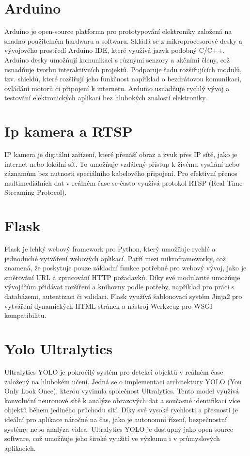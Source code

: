\section{Arduino}\label{sec:arduino}
Arduino je open-source platforma pro prototypování elektroniky založená na snadno použitelném hardwaru a softwaru.
Skládá se z mikroprocesorové desky a vývojového prostředí Arduino IDE, které využívá jazyk podobný C/C++.
Arduino desky umožňují komunikaci s různými senzory a akčními členy, což usnadňuje tvorbu interaktivních projektů.
Podporuje řadu rozšiřujících modulů, tzv. shieldů, které rozšiřují jeho funkčnost například o bezdrátovou komunikaci, ovládání motorů či připojení k internetu.
Arduino usnadňuje rychlý vývoj a testování elektronických aplikací bez hlubokých znalostí elektroniky.


\section{Ip kamera a RTSP}\label{sec:ipcamera-rtsp}
IP kamera je digitální zařízení, které přenáší obraz a zvuk přes IP sítě, jako je internet nebo lokální síť.
To umožňuje vzdálený přístup k živému vysílání nebo záznamům bez nutnosti speciálního kabelového připojení.
Pro efektivní přenos multimediálních dat v reálném čase se často využívá protokol RTSP (Real Time Streaming Protocol).


\section{Flask}\label{sec:flask}
Flask je lehký webový framework pro Python, který umožňuje rychlé a jednoduché vytváření webových aplikací.
Patří mezi mikroframeworky, což znamená, že poskytuje pouze základní funkce potřebné pro webový vývoj, jako je směrování URL a zpracování HTTP požadavků.
Díky své modularitě umožňuje vývojářům přidávat rozšíření a knihovny podle potřeby, například pro práci s databázemi, autentizaci či validaci.
Flask využívá šablonovací systém Jinja2 pro vytváření dynamických HTML stránek a nástroj Werkzeug pro WSGI kompatibilitu.


\section{Yolo Ultralytics}\label{sec:yolo-ultralytics}
Ultralytics YOLO je pokročilý systém pro detekci objektů v reálném čase založený na hlubokém učení. Jedná se o implementaci architektury YOLO (You Only Look Once), kterou vyvinula společnost Ultralytics. Tento model využívá konvoluční neuronové sítě k analýze obrazových dat a současné identifikaci více objektů během jediného průchodu sítí. Díky své vysoké rychlosti a přesnosti je ideální pro aplikace náročné na čas, jako je autonomní řízení, bezpečnostní systémy nebo analýza videa. Ultralytics YOLO je dostupný jako open-source software, což umožňuje jeho široké využití ve výzkumu i v průmyslových aplikacích.


